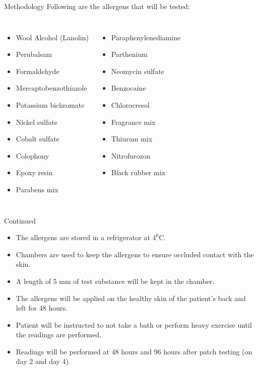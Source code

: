 \documentclass[11pt]{beamer}
\begin{document}
\begin{frame}{Methodology}
Following are the allergens that will be tested:\\
\begin{columns}


\begin{itemize}
\item Wool Alcohol (Lanolin)
\item Perubalsam
\item Formaldehyde
\item Mercaptobenzothiazole
\item Potassium bichromate
\item Nickel sulfate
\item Cobalt sulfate
\item Colophony
\item Epoxy resin
\item Parabens mix

\end{itemize}

\begin{itemize}
\item Paraphenylenediamine
\item Parthenium
\item Neomycin sulfate
\item Benzocaine
\item Chlorocresol
\item Fragrance mix
\item Thiuram mix
\item Nitrofurozon
\item Black rubber mix

\end{itemize}	
\end{columns}

\end{frame}

\begin{frame}{Continued}
\begin{itemize}
\item The allergens are stored in a refrigerator at $4^0$C.
\item Chambers  are used to keep the allergens to ensure occluded contact with the skin.
\item A length of 5 mm of test substance will be kept in the chamber. 
\item The allergens will be applied on the healthy skin of the patient's back and left for 48 hours.
\item Patient will be instructed to not take a bath or perform heavy exercise until the readings are performed.
\item Readings will be performed at 48 hours and 96 hours after patch testing (on day 2 and day 4). 


\end{itemize}
\end{frame}
\end{document}
